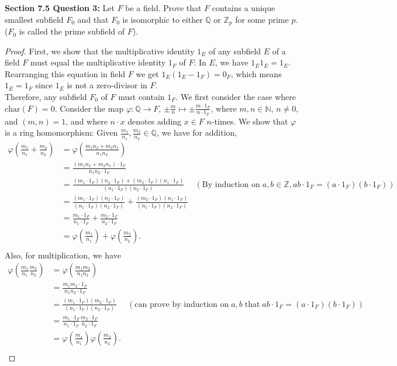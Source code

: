 \documentclass{article}
\begin{document}
\textbf{Section 7.5 Question 3:} Let $F$ be a field. Prove that $F$
  contains a unique smallest subfield $F_0$ and that $F_0$ is isomorphic to
  either $\mathbb{Q}$ or $\mathbb{Z}_p$ for some prime $p$. ($F_0$ is
  called the prime subfield of $F$).

  \begin{proof}
    First, we show that the multiplicative identity $1_E$ of any subfield
    $E$ of a field $F$ must equal the multiplicative identity $1_F$ of $F$:
    In $E$, we have $1_E1_E=1_E$. Rearranging this equation in field $F$ we
    get $1_E(1_E-1_F)=0_F$, which means $1_E=1_F$ since $1_E$ is not a
    zero-divisor in $F$. \\

    Therefore, any subfield $F_0$ of $F$ must contain $1_F$. We first
    consider the case where $\text{char}(F)=0$. Consider the map
    $\varphi:\mathbb{Q}\rightarrow F$, $\pm\frac{m}{n}\mapsto\pm\frac{m\cdot
    1_F}{n\cdot 1_F}$, where $m,n\in\mathbb{N}$, $n\neq0$, and $(m,n)=1$,
    and where $n\cdot x$ denotes adding $x\in F$ $n$-times.
    We show that $\varphi$ is a ring homomorphism: Given
    $\frac{m_1}{n_1},\frac{m_2}{n_2}\in\mathbb{Q}$, we have for addition,
    \begin{align*}
      \varphi\left(\frac{m_1}{n_1}+\frac{m_2}{n_2}\right) &=
        \varphi\left(\frac{m_1n_2+m_2n_1}{n_1n_2}\right) & \\
        &= \frac{(m_1n_2+m_2n_1)\cdot1_F}{n_1n_2\cdot1_F} & \\
        &= \frac{(m_1\cdot1_F)(n_2\cdot1_F)+(m_2\cdot1_F)(n_1\cdot1_F)}
        {(n_1\cdot1_F)(n_2\cdot1_F)}
        &
        (\text{By induction on}\; a,b\in\mathbb{Z},
        ab\cdot1_F=(a\cdot1_F)(b\cdot1_F)) \\
        &= \frac{(m_1\cdot1_F)(n_2\cdot1_F)}{(n_1\cdot1_F)(n_2\cdot1_F)}+
        \frac{(m_2\cdot1_F)(n_1\cdot1_F)}{(n_1\cdot1_F)(n_2\cdot1_F)} &
        \\
        &= \frac{m_1\cdot1_F}{n_1\cdot1_F}+ \frac{m_2\cdot1_F}{n_2\cdot1_F} &
        \\
        &= \varphi\left(\frac{m_1}{n_1}\right)+
        \varphi\left(\frac{m_2}{n_2}\right). & \\
    \end{align*}
    Also, for multiplication, we have
    \begin{align*}
      \varphi\left(\frac{m_1}{n_1}\frac{m_2}{n_2}\right) &=
        \varphi\left(\frac{m_1m_2}{n_1n_2}\right) & \\
        &= \frac{m_1m_2\cdot1_F}{n_1n_2\cdot1_F} & \\
        &= \frac{(m_1\cdot1_F)(m_2\cdot1_F)}{(n_1\cdot1_F)(n_2\cdot1_F)} &
        (\text{can prove by induction on}\; a,b\; \text{that}\;
        ab\cdot1_F=(a\cdot1_F)(b\cdot1_F)) \\
        &= \frac{m_1\cdot1_F}{n_1\cdot1_F} \frac{m_2\cdot1_F}{n_2\cdot1_F} &
        \\
        &= \varphi\left(\frac{m_1}{n_1}\right)
        \varphi\left(\frac{m_2}{n_2}\right). & \\
    \end{align*}


\end{proof}
\end{document}
